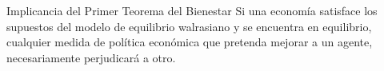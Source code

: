 \begin{frame}{Implicancia del Primer Teorema del Bienestar}
	Si una economía satisface los supuestos del modelo de equilibrio walrasiano y se encuentra en equilibrio, cualquier medida de política económica que pretenda mejorar a un agente, necesariamente perjudicará a otro.
\end{frame}
